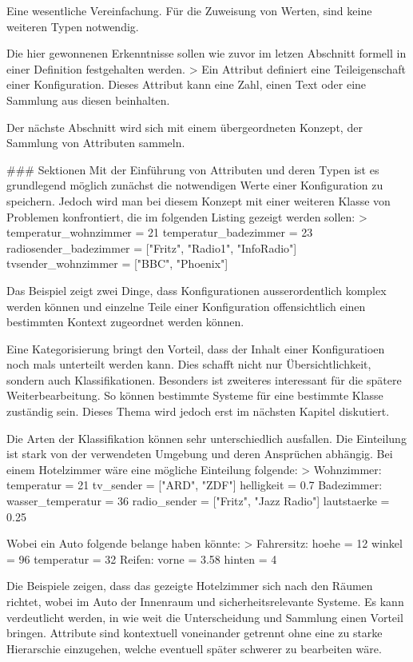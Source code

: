 Eine wesentliche Vereinfachung. Für die Zuweisung von Werten, sind keine weiteren Typen notwendig. 

Die hier gewonnenen Erkenntnisse sollen wie zuvor im letzen Abschnitt formell in einer Definition festgehalten werden.
> Ein Attribut definiert eine Teileigenschaft einer Konfiguration. Dieses Attribut kann eine Zahl, einen Text oder eine Sammlung aus diesen beinhalten.

Der nächste Abschnitt wird sich mit einem übergeordneten Konzept, der Sammlung von Attributen sammeln.


### Sektionen
Mit der Einführung von Attributen und deren Typen ist es grundlegend möglich zunächst die notwendigen Werte einer Konfiguration zu speichern. Jedoch wird man bei diesem Konzept mit einer weiteren Klasse von Problemen konfrontiert, die im folgenden Listing gezeigt werden sollen:
> temperatur_wohnzimmer = 21
	temperatur_badezimmer = 23
	radiosender_badezimmer = ["Fritz", "Radio1", "InfoRadio"]
	tvsender_wohnzimmer = ["BBC", "Phoenix"]
	
Das Beispiel zeigt zwei Dinge, dass Konfigurationen ausserordentlich komplex werden können und einzelne Teile einer Konfiguration offensichtlich einen bestimmten Kontext zugeordnet werden können. 

Eine Kategorisierung bringt den Vorteil, dass der Inhalt einer Konfiguratioen noch mals unterteilt werden kann. Dies schafft nicht nur Übersichtlichkeit, sondern auch Klassifikationen. Besonders ist zweiteres interessant für die spätere Weiterbearbeitung. So können bestimmte Systeme für eine bestimmte Klasse zuständig sein. Dieses Thema wird jedoch erst im nächsten Kapitel diskutiert. 

Die Arten der Klassifikation können sehr unterschiedlich ausfallen. Die Einteilung ist stark von der verwendeten Umgebung und deren Ansprüchen abhängig. Bei einem Hotelzimmer wäre eine mögliche Einteilung folgende: 
> Wohnzimmer: 
		temperatur = 21
		tv_sender = ["ARD", "ZDF"]
		helligkeit = 0.7
	Badezimmer: 
		wasser_temperatur = 36
		radio_sender = ["Fritz", "Jazz Radio"]
		lautstaerke = 0.25

Wobei ein Auto folgende belange haben könnte:
> Fahrersitz:
		hoehe = 12
		winkel = 96
		temperatur = 32
	Reifen: 
		vorne = 3.58
		hinten = 4

Die Beispiele zeigen, dass das gezeigte Hotelzimmer sich nach den Räumen richtet, wobei im Auto der Innenraum und sicherheitsrelevante Systeme. Es kann verdeutlicht werden, in wie weit die Unterscheidung und Sammlung einen Vorteil bringen. Attribute sind kontextuell voneinander getrennt ohne eine zu starke Hierarschie einzugehen, welche eventuell später schwerer zu bearbeiten wäre.

